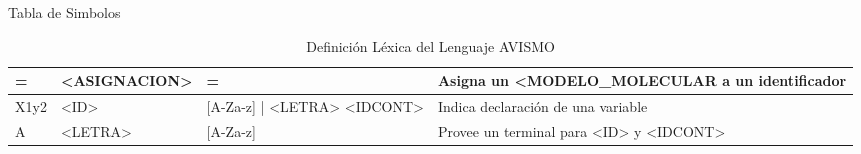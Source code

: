 \documentclass[14pt, aspectratio=169]{beamer}
\begin{document}
\begin{frame}{Tabla de Simbolos}

\begin{table}[ht]
    \footnotesize
    \begin{tabularx}{\linewidth}{|X|X|X|X|}
        \hline
        =      & <ASIGNACION>          & =                                                                     & Asigna un <MODELO\_MOLECULAR a un identificador   \\\hline
        X1y2   & <ID>                  & [A-Za-z] | <LETRA> <IDCONT>                                           & Indica declaración de una variable                \\\hline
        A      & <LETRA>               & [A-Za-z]                                                              & Provee un terminal para <ID> y <IDCONT>           \\\hline
    \end{tabularx}
    \label{table: lexTable2}
    \caption{Definición Léxica del Lenguaje AVISMO}
\end{table}
\end{frame}
\end{document}
